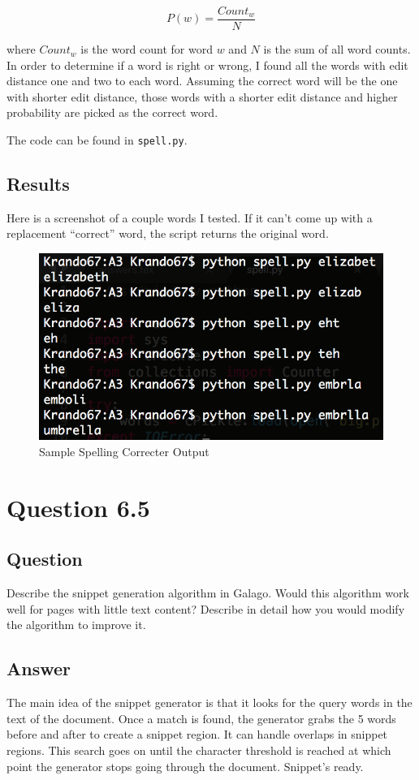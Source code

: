 \documentclass[10pt,letterpaper,bibliography=totoc]{scrartcl}
\begin{document}
\[P(w) = \frac{Count_w}{N}\]

where \(Count_w\) is the word count for word \(w\) and \(N\) is the sum of all word counts.\\

In order to determine if a word is right or wrong, I found all the words with edit distance one and two to each word. Assuming the correct word will be the one with shorter edit distance, those words with a shorter edit distance and higher probability are picked as the correct word. 

The code can be found in \texttt{spell.py}.

\subsection{Results}
Here is a screenshot of a couple words I tested. If it can't come up with a replacement ``correct'' word, the script returns the original word.
\begin{figure}[h!]
\centering
\label{fig:sample_spelling}
\includegraphics[scale=.5]{sample_spelling.png}
\caption{Sample Spelling Correcter Output}
\end{figure}


\section{Question 6.5}

\subsection{Question}
Describe the snippet generation algorithm in Galago. Would this algorithm
work well for pages with little text content? Describe in detail how you would
modify the algorithm to improve it.

\subsection{Answer}
The main idea of the snippet generator is that it looks for the query words in the text of the document. Once a match is found, the generator grabs the 5 words before and after to create a snippet region. It can handle overlaps in snippet regions. This search goes on until the character threshold is reached at which point the generator stops going through the document. Snippet's ready. 
\end{document}
